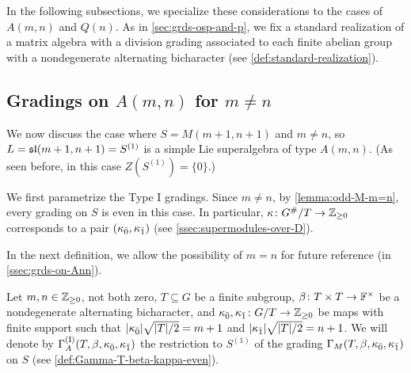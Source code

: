 In the following subsections, we specialize these considerations to the cases of $A(m,n)$ and $Q(n)$. 
As in \cref{sec:grds-osp-and-p}, we fix a standard realization of a matrix algebra with a division grading associated to each finite abelian group with a nondegenerate alternating bicharacter (see \cref{def:standard-realization}). 


\subsection{Gradings on \texorpdfstring{$A(m,n)$}{A(m,n)} for \texorpdfstring{$m \neq n$}{m different than n}}\label{ssec:grds-on-A-m-n}

We now discuss the case where $S = M(m+1, n+1)$ and $m \neq n$,  
so $L = \mathfrak{sl}(m+1, n+1) = S^{(1)}$ is a simple Lie superalgebra of type $A(m,n)$. 
(As seen before, in this case $Z(S^{(1)}) = \{ 0 \}$.)

We first parametrize the Type I gradings. 
Since $m\neq n$, by \cref{lemma:odd-M-m=n}, every grading on $S$ is even in this case. 
In particular, $\kappa\colon G^\#/T \to \mathbb{Z}_{\geq 0}$ corresponds to a pair $(\kappa_{\bar{0}}, \kappa_{\bar{1}})$ (see \cref{ssec:supermodules-over-D}). 

In the next definition, we allow the possibility of $m=n$ for future reference (in \cref{ssec:grds-on-Ann}).

\begin{defi}\label{def:A-Type-I}
    Let $m, n\in \mathbb{Z}_{\geq 0}$, not both zero, $T \subseteq G$ be a finite subgroup, $\beta\colon T\times T \to \mathbb{F}^\times$ be a nondegenerate alternating bicharacter, and $\kappa_{\bar{0}}, \kappa_{\bar{1}} \colon G/T \to \mathbb{Z}_{\geq 0}$ be maps with finite support such that $|\kappa_{\bar{0}}| \sqrt{|T|/2} = m+1$ and $|\kappa_{\bar{1}}| \sqrt{|T|/2} = n+1$. 
    We will denote by $\Gamma^{\mathrm{(I)}}_A(T, \beta, \kappa_{\bar{0}}, \kappa_{\bar{1}})$ the restriction to $S^{(1)}$ of the grading $\Gamma_M(T, \beta, \kappa_{\bar{0}}, \kappa_{\bar{1}})$ on $S$ (see \cref{def:Gamma-T-beta-kappa-even}). 
\end{defi}

